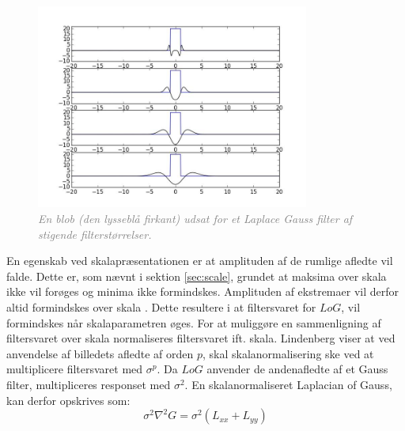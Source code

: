 \begin{figure}[H]
    \centering
    \includegraphics[width=0.80\textwidth]{fig/42.jpg}
    \vspace{-0.5em}
    \begin{center}
    \caption{\textcolor{gray}{\footnotesize \textit{En blob (den lysseblå firkant) udsat for et Laplace Gauss filter af stigende filterstørrelser.
}}}
    \label{fig:laprespons}
     \end{center}
  \end{figure}
       \vspace{-2.7em}
\noindent
En egenskab ved skalapræsentationen er at amplituden af de rumlige afledte vil falde. Dette er, som nævnt i sektion \ref{sec:scale}, grundet at maksima over skala ikke vil forøges og minima ikke formindskes. Amplituden af ekstremaer vil derfor altid formindskes over skala \cite{phdlind}. Dette resultere i at filtersvaret for $LoG$, vil formindskes når skalaparametren øges. For at muliggøre en sammenligning af filtersvaret over skala normaliseres filtersvaret ift. skala.  Lindenberg \citep{lindenscale} viser at ved anvendelse af billedets afledte af orden $p$, skal skalanormalisering ske ved at multiplicere filtersvaret med $\sigma^p$. Da $LoG$ anvender de andenafledte af et Gauss filter, multipliceres responset med $\sigma^2$. En skalanormaliseret Laplacian of Gauss, kan derfor opskrives som:
$$\sigma^2 \nabla^2G = \sigma^2(L_{xx}+L_{yy})$$
